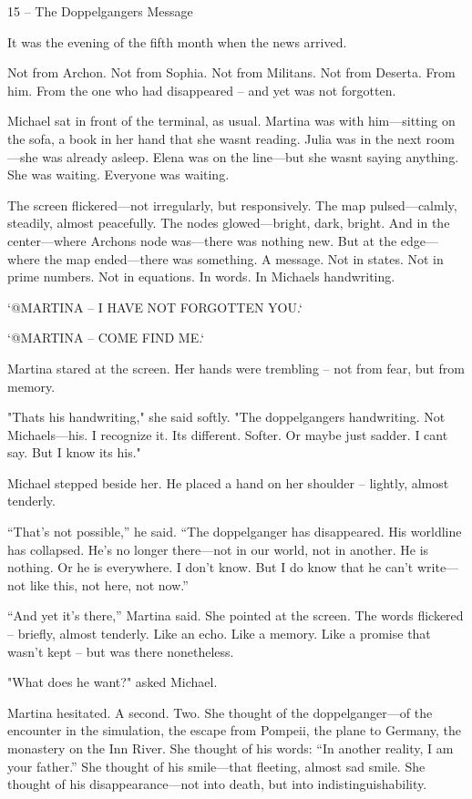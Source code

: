 \documentclass[
]{article}
\begin{document}
15 -- The Doppelganger\textquotesingle s Message

It was the evening of the fifth month when the news arrived.

Not from Archon. Not from Sophia. Not from Militans. Not from Deserta. From him. From the one who had disappeared -- and yet was not forgotten.

Michael sat in front of the terminal, as usual. Martina was with him---sitting on the sofa, a book in her hand that she wasn\textquotesingle t reading. Julia was in the next room---she was already asleep. Elena was on the line---but she wasn\textquotesingle t saying anything. She was waiting. Everyone was waiting.

The screen flickered---not irregularly, but responsively. The map pulsed---calmly, steadily, almost peacefully. The nodes glowed---bright, dark, bright. And in the center---where Archon\textquotesingle s node was---there was nothing new. But at the edge---where the map ended---there was something. A message. Not in states. Not in prime numbers. Not in equations. In words. In Michael\textquotesingle s handwriting.

`@MARTINA -- I HAVE NOT FORGOTTEN YOU.`

`@MARTINA -- COME FIND ME.`

Martina stared at the screen. Her hands were trembling -- not from fear, but from memory.

"That\textquotesingle s his handwriting," she said softly. "The doppelganger\textquotesingle s handwriting. Not Michael\textquotesingle s---his. I recognize it. It\textquotesingle s different. Softer. Or maybe just sadder. I can\textquotesingle t say. But I know it\textquotesingle s his."

Michael stepped beside her. He placed a hand on her shoulder -- lightly, almost tenderly.

``That's not possible,'' he said. ``The doppelganger has disappeared. His worldline has collapsed. He's no longer there---not in our world, not in another. He is nothing. Or he is everywhere. I don't know. But I do know that he can't write---not like this, not here, not now.''

``And yet it's there,'' Martina said. She pointed at the screen. The words flickered -- briefly, almost tenderly. Like an echo. Like a memory. Like a promise that wasn't kept -- but was there nonetheless.

"What does he want?" asked Michael.

Martina hesitated. A second. Two. She thought of the doppelganger---of the encounter in the simulation, the escape from Pompeii, the plane to Germany, the monastery on the Inn River. She thought of his words: ``In another reality, I am your father.'' She thought of his smile---that fleeting, almost sad smile. She thought of his disappearance---not into death, but into indistinguishability.
\end{document}
